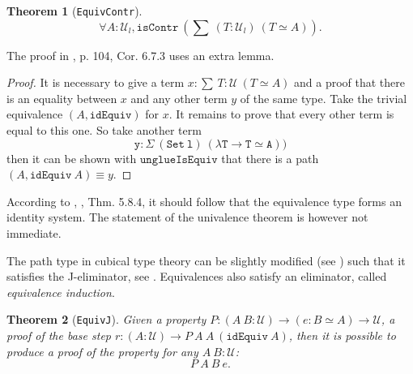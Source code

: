 \documentclass[12pt,a4paper,twoside,xetex]{book} %
\newcommand{\keyword}[1]{\emph{#1}\index{#1}}
\newtheorem{theorem}{Theorem}[section]
\newcommand{\op}[1]{\mathtt{#1}}
\newcommand{\type}{\mathcal{U}}
\begin{document}
\begin{theorem}[\texttt{EquivContr}]\label{contrSingl}
 $$\forall A : \type_l, \op{isContr} \ \left( \sum \ (T : \type_l) \  \left( T 
\simeq A \right) \right).$$ 
\end{theorem}


The proof in \cite{Huber2016}, p. 104, Cor. 6.7.3 uses an extra lemma.

\begin{proof}
It is necessary to give a term $x : \sum \ T : \type \  \left( T \simeq 
A \right)$ and a proof that there is an equality between $x$ and any other term 
$y$ of the same type. Take the trivial equivalence  $(A, \op{idEquiv})$ for 
$x$. It remains to prove that every other term is equal to this one. So take 
another term $$\op{y : Σ\ (Set\ l)\ (λ T → T ≃ A))}$$ then it can be shown with 
$\op{unglueIsEquiv}$ that there is a path $(A , \texttt{idEquiv}\ A) \equiv y$.
\end{proof}


According to \cite{Huber2016}, \cite{Voevodsky2013}, Thm. 5.8.4, it should 
follow that the equivalence type forms an identity system. The statement of the 
univalence theorem is however not immediate.

The path type in cubical type theory can be slightly modified (see 
) such that it satisfies the J-eliminator, see 
. Equivalences also satisfy an eliminator, called 
\keyword{equivalence induction}. 

\begin{theorem}[\texttt{EquivJ}]
Given a property $P: (A \ B : \mathcal{U}) \rightarrow (e : B \simeq A) 
\rightarrow \mathcal{U}$, a proof of the base step $r : (A : \mathcal{U}) 
\rightarrow P \ A\ A \ (\texttt{idEquiv} \ A)$, then it is possible to produce 
a proof of the property for any $A \ B: \mathcal{U}$: $$ P\  A \ B\ e.$$
\end{theorem}
\end{document}
